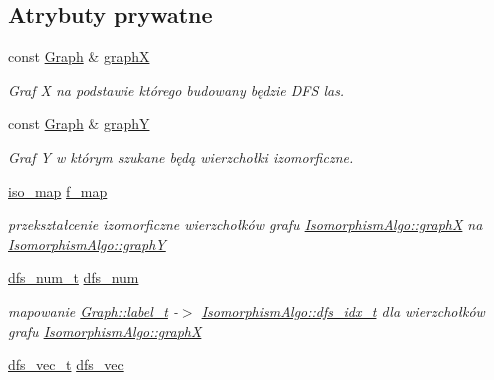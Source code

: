 \subsection*{Atrybuty prywatne}
\begin{DoxyCompactItemize}
\item 
const \hyperlink{classGraph}{Graph} \& \hyperlink{classIsomorphismAlgo_a78bc7264b0a6a264b0343209b3ca3647}{graph\-X}
\begin{DoxyCompactList}\small\item\em Graf X na podstawie którego budowany będzie D\-F\-S las. \end{DoxyCompactList}\item 
const \hyperlink{classGraph}{Graph} \& \hyperlink{classIsomorphismAlgo_a7656ae201d816e62edda60462cdb3a6e}{graph\-Y}
\begin{DoxyCompactList}\small\item\em Graf Y w którym szukane będą wierzchołki izomorficzne. \end{DoxyCompactList}\item 
\hyperlink{classIsomorphismAlgo_ad95c1101cd4ef09d4a581d8fbe44aff0}{iso\-\_\-map} \hyperlink{classIsomorphismAlgo_a75072a3ecb3b6ed97207b016a83b8571}{f\-\_\-map}
\begin{DoxyCompactList}\small\item\em przekształcenie izomorficzne wierzchołków grafu \hyperlink{classIsomorphismAlgo_a78bc7264b0a6a264b0343209b3ca3647}{Isomorphism\-Algo\-::graph\-X} na \hyperlink{classIsomorphismAlgo_a7656ae201d816e62edda60462cdb3a6e}{Isomorphism\-Algo\-::graph\-Y} \end{DoxyCompactList}\item 
\hyperlink{classIsomorphismAlgo_a848c1d965a1c201d768513f756629bbe}{dfs\-\_\-num\-\_\-t} \hyperlink{classIsomorphismAlgo_a4de551ab18fc95ef86ea8c79260656b2}{dfs\-\_\-num}
\begin{DoxyCompactList}\small\item\em mapowanie \hyperlink{classGraph_a2237a0ada8484c37b8200c0e3685ca71}{Graph\-::label\-\_\-t} -\/$>$ \hyperlink{classIsomorphismAlgo_ab4ec6489271a99fae3bd2476b22ef35b}{Isomorphism\-Algo\-::dfs\-\_\-idx\-\_\-t} dla wierzchołków grafu \hyperlink{classIsomorphismAlgo_a78bc7264b0a6a264b0343209b3ca3647}{Isomorphism\-Algo\-::graph\-X} \end{DoxyCompactList}\item 
\hyperlink{classIsomorphismAlgo_a906dbedec7eb2192c4a8963323031704}{dfs\-\_\-vec\-\_\-t} \hyperlink{classIsomorphismAlgo_affd06f1251c222a483b7188313a11193}{dfs\-\_\-vec}

\end{DoxyCompactItemize}
